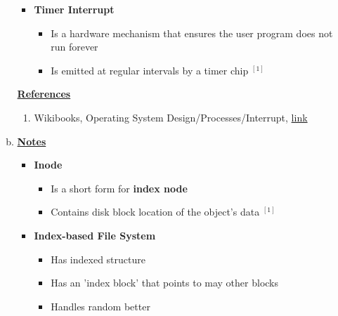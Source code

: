 \documentclass[12pt]{article}
\begin{document}
\begin{enumerate}[1.]
\begin{enumerate}[a)]
\begin{itemize}
\begin{itemize}
            \end{itemize}

            \item \textbf{Timer Interrupt}

            \begin{itemize}
                \item Is a hardware mechanism that ensures the user program does not run forever
                \item Is emitted at regular intervals by a timer chip $^{[1]}$
            \end{itemize}
        \end{itemize}

        \bigskip

        \underline{\textbf{References}}

        \begin{enumerate}[1)]
            \item Wikibooks, Operating System Design/Processes/Interrupt, \href{https://en.wikibooks.org/wiki/Operating_System_Design/Processes/Interrupt#:~:text=Perhaps%20the%20most%20important%20interrupt,processor%20executing%20a%20specific%20instruction.}{link}
        \end{enumerate}

        \item

        \bigskip

        \underline{\textbf{Notes}}

        \begin{itemize}

            \item \textbf{Inode}

            \begin{itemize}
                \item Is a short form for \textbf{index node}
                \item Contains disk block location of the object's data $^{[1]}$
            \end{itemize}
            \item \textbf{Index-based File System}

            \begin{itemize}
                \item Has indexed structure
                \item Has an 'index block' that points to may other blocks
                \item Handles random better
            \end{itemize}


\end{itemize}
\end{enumerate}
\end{enumerate}
\end{document}
